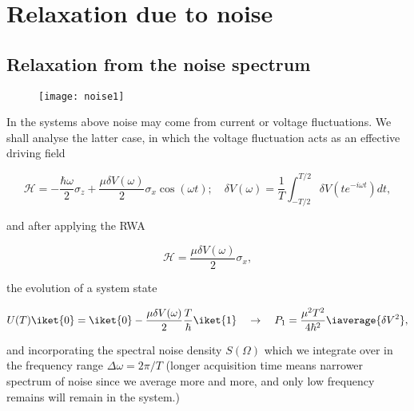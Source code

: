 \section{Relaxation due to noise}
\subsection{Relaxation from the noise spectrum}

\begin{figure}[h]
  \centering \texttt{[image: noise1]}
\end{figure}

\noindent

\noindent In the  systems above noise may come from  current or voltage
fluctuations. We  shall analyse the  latter case, in which  the voltage
fluctuation acts as an effective driving field

\begin{equation}\label{noise1}
  \mathcal{H} = -\frac{\hbar\omega}{2}\sigma_z+\frac{\mu\delta V(\omega)}{2}\sigma_x\cos(\omega t);\quad\delta V(\omega) = \frac{1}{T}\int_{-T/2}^{T/2}\delta V(t e^{-i\omega t})dt,
\end{equation}

\noindent and after applying the RWA

\begin{equation}\label{noise2}
  \mathcal{H} = \frac{\mu\delta V(\omega)}{2}\sigma_x,
\end{equation}

\noindent the evolution of a system state

\begin{equation}\label{noise3}
  U(T)\iket{0} = \iket{0} - \frac{\mu\delta V(\omega)}{2}\frac{T}{\hbar}\iket{1} \quad \rightarrow \quad P_1 = \frac{\mu^2T^2}{4\hbar^2}\iaverage{\delta V^2},
\end{equation}

\noindent and incorporating  the spectral noise density $  S(\Omega) $ which
we integrate  over in  the frequency  range $  \Delta\omega =  2\pi/T $
(longer  acquisition time  means narrower  spectrum of  noise since  we
average more  and more, and only  low frequency remains will  remain in
the system.)

